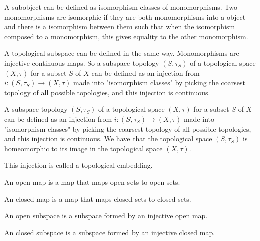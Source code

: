 \begin{definition}
    \label{definition-topological-subspace}
    A subobject can be defined as isomorphism classes of monomorphisms. Two monomorphisms are isomorphic if they are both monomorphisms into a object and there is a isomorphism between them such that when the isomorphism composed to a monomorphism, this gives equality to the other monomorphism.
    
	A topological subspace can be defined in the same way.
	Monomorphisms are injective continuous maps.
	So a subspace topology $(S, \tau_S)$ of a topological space $(X, \tau)$ for a subset $S$ of $X$ can be defined as an injection from $i: (S, \tau_S) \rightarrow (X, \tau)$ made into "isomorphism classes" by picking the coarsest topology of all possible topologies, and this injection is continuous.
\end{definition}

\begin{definition}
    \label{definition-topological-embedding}
    
	A subspace topology $(S, \tau_S)$ of a topological space $(X, \tau)$ for a subset $S$ of $X$ can be defined as an injection from $i: (S, \tau_S) \rightarrow (X, \tau)$ made into "isomorphism classes" by picking the coarsest topology of all possible topologies, and this injection is continuous. We have that the topological space $(S, \tau_S)$ is homeomorphic to its image in 
	the topological space $(X, \tau)$.

	This injection is called a topological embedding.
\end{definition}

\begin{definition}
	\label{definition-open-map}
	
	An open map is a map that maps open sets to open sets.
\end{definition}

\begin{definition}
	\label{definition-closed-map}
	
	An closed map is a map that maps closed sets to closed sets.
\end{definition}

\begin{definition}
	\label{definition-open-subspace}
	
	An open subspace is a subspace formed by an injective open map.
\end{definition}

\begin{definition}
	\label{definition-closed-subspace}
	
	An closed subspace is a subspace formed by an injective closed map.
\end{definition}